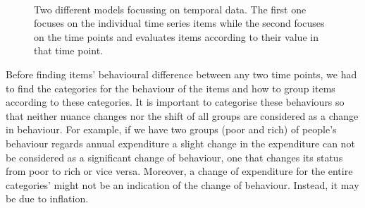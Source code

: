 \begin{figure}[!h]
		\hfill{\begin{minipage}{\dimexpr \textwidth-2\fboxsep-2\fboxrule}%
		\centering
		\\
		
		\end{minipage}}
	\caption{Two different models focussing on temporal data. The first one focuses on the individual time series items while the second focuses on the time points and evaluates items according to their value in that time point. }
	\label{fig:temporaldatamodel}
\end{figure}

Before finding items' behavioural difference between any two time points, we had to find the categories for the behaviour of the items and how to group items according to these categories. It is important to categorise these behaviours so that neither nuance changes nor the shift of all groups are considered as a change in behaviour. For example, if we have two groups (poor and rich) of people's behaviour regards annual expenditure a slight change in the expenditure can not be considered as a significant change of behaviour, one that changes its status from poor to rich or vice versa. Moreover, a change of expenditure for the entire categories' might not be an indication of the change of behaviour. Instead, it may be due to inflation.

